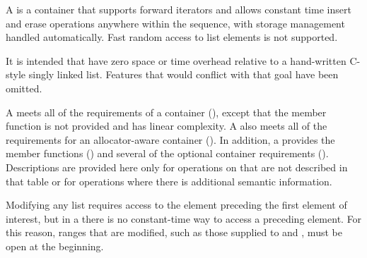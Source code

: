 \pnum
A  is a container that supports forward iterators and allows
constant time insert and erase operations anywhere within the sequence, with storage
management handled automatically. Fast random access to list elements is not supported.
\begin{note}
It is intended that  have zero space or time overhead
relative to a hand-written C-style singly linked list. Features that would conflict with
that goal have been omitted.
\end{note}

\pnum
A  meets all of the requirements of a container
(), except that the 
member function is not provided and  has linear complexity.
A  also meets all of the requirements for an allocator-aware
container (). In addition, a 
provides the  member functions
() and several of the optional
container requirements ().
Descriptions are provided here only for operations on
 that are not described in that table or for operations where there
is additional semantic information.

\pnum
\begin{note}
Modifying any list requires access to the element preceding the first element
of interest, but in a  there is no constant-time way to access a
preceding element. For this reason, ranges that are modified, such as those supplied to
 and , must be open at the beginning.
\end{note}

